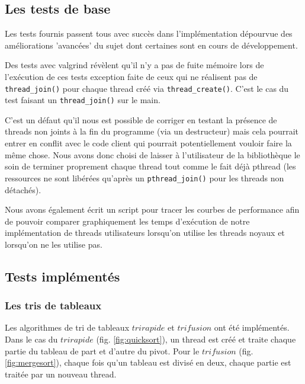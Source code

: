 \subsection{Les tests de base}

Les tests fournis passent tous avec succès dans l'implémentation dépourvue des
améliorations 'avancées' du sujet dont certaines sont en cours de
développement.

Des tests avec valgrind révèlent qu'il n'y a pas de fuite mémoire lors de
l'exécution de ces tests exception faite de ceux qui ne réalisent pas de
\verb!thread_join()! pour chaque thread créé via \verb!thread_create()!. C'est
le cas du test faisant un \verb!thread_join()! sur le main.

C'est un défaut qu'il nous est possible de corriger en testant la présence de
threads non joints à la fin du programme (via un destructeur) mais cela pourrait
entrer en conflit avec le code client qui pourrait potentiellement vouloir
faire la même chose. Nous avons donc choisi de laisser à l'utilisateur de la
bibliothèque le soin de terminer proprement chaque thread tout comme le fait
déjà pthread (les ressources ne sont libérées qu'après un \verb!pthread_join()!
pour les threads non détachés).

Nous avons également écrit un script pour tracer les courbes de performance
afin de pouvoir comparer graphiquement les temps d'exécution de notre
implémentation de threads utilisateurs lorsqu'on utilise les threads noyaux
et lorsqu'on ne les utilise pas.

\subsection{Tests implémentés}

\subsubsection{Les tris de tableaux} Les algorithmes de tri de tableaux $tri
rapide$ et $tri fusion$ ont été implémentés. Dans le cas du $tri rapide$
(fig. \ref{fig:quicksort}), un thread est créé et traite chaque partie du
tableau de part et d'autre du pivot. Pour le $tri fusion$
(fig. \ref{fig:mergesort}), chaque fois qu'un tableau est divisé en deux,
chaque partie est traitée par un nouveau thread.\\

